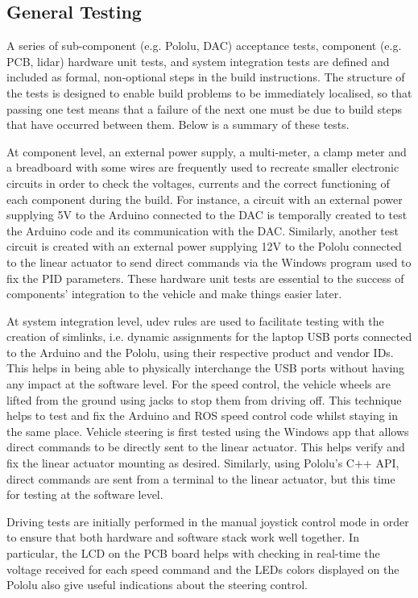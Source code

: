 \documentclass[a4paper]{article}
\begin{document}
	
	\subsection{ General Testing}\label{h.wbekh9ay82yu}
	
	A series of sub-component (e.g. Pololu, DAC) acceptance tests, component (e.g. PCB, lidar) hardware unit tests, and system integration tests are defined and included as formal, non-optional steps in the build instructions.  The structure of the tests is designed to enable build problems to be immediately localised, so that passing one test means that a failure of the next one must be due to build steps that have occurred between them. Below is a summary of these tests.
	
	At component level, an external power supply, a multi-meter, a clamp meter and a breadboard with some wires are frequently used to recreate smaller electronic circuits in order to check the voltages, currents and the correct functioning of each component during the build. For instance, a circuit with an external power supplying 5V to the Arduino connected to the DAC is temporally created to test the Arduino code and its communication with the DAC.  Similarly, another test circuit is created with an external power supplying 12V to the Pololu connected to the linear actuator to send direct commands via the Windows program used to fix the PID parameters. These hardware unit tests are essential to the success of components' integration to the vehicle and make things easier later. 
	
	At system integration level, udev rules are used to facilitate testing with the creation of simlinks, i.e. dynamic assignments for the laptop USB ports connected to the Arduino and the Pololu, using their respective product and vendor IDs. This helps in being able to physically interchange the USB ports without having any impact at the software level. For the speed control, the vehicle wheels are lifted from the ground using jacks to stop them from driving off. This technique helps to test and fix the Arduino and ROS speed control code whilst staying in the same place. Vehicle steering is first tested using the Windows app that allows direct commands to be directly sent to the linear actuator. This helps verify and fix the linear actuator mounting as desired. Similarly, using Pololu's C++ API, direct commands are sent from a terminal to the linear actuator, but this time for testing at the software level. 
	
	Driving tests are initially performed in the manual joystick control mode in order to ensure that both hardware and software stack work well together. In particular, the LCD on the PCB board helps with checking in real-time the voltage received for each speed command and the LEDs colors displayed on the Pololu also give useful indications about the steering control. 
	
\end{document}
